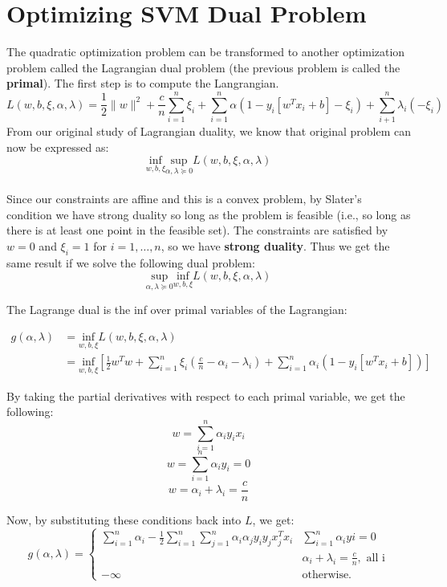 \documentclass[12pt]{article}
\begin{document}
\section{Optimizing SVM Dual Problem}
The quadratic optimization problem can be transformed to another optimization problem called the Lagrangian dual problem (the previous problem is called the \textbf{primal}). The first step is to compute the Langrangian.
$$L(w,b,\xi,\alpha,\lambda) = \frac{1}{2} \lVert w \rVert^{2} + \frac{c}{n} \sum_{i=1}^{n} \xi_{i} + \sum_{i=1}^{n} \alpha (1-y_{i}[w^{T}x_{i}+b]-\xi_{i}) + \sum_{i+1}^{n} \lambda_{i} (-\xi_{i})$$
From our original study of Lagrangian duality, we know that original problem can now be expressed as:
$$\underset{w,b,\xi}{\text{inf}} \underset{\alpha,\lambda \succcurlyeq 0}{\text{sup}} L(w,b,\xi,\alpha,\lambda)$$\\
Since our constraints are affine and this is a convex problem, by Slater's condition we have strong duality so long as the problem is feasible (i.e., so long as there is at least one point in the feasible set). The constraints are satisfied by $w=0$ and $\xi_{i} = 1$ for $i = 1,\dots,n$, so we have \textbf{strong duality}. Thus we get the same result if we solve the following dual problem:
$$\underset{\alpha,\lambda \succcurlyeq 0}{\text{sup}} \underset{w,b,\xi}{\text{inf}} L(w,b,\xi,\alpha,\lambda)$$

The Lagrange dual is the inf over primal variables of the Lagrangian:

\begin{equation}
\begin{split}
g(\alpha, \lambda) & = \underset{w,b,\xi}{\text{inf}} L(w,b,\xi,\alpha,\lambda) \\
 & = \underset{w,b,\xi}{\text{inf}} [\frac{1}{2}w^{T}w + \sum_{i=1}^{n} \xi_{i}(\frac{c}{n} - \alpha_{i} - \lambda_{i}) + \sum_{i=1}^{n} \alpha_{i} (1 - y_{i}[w^{T}x_{i} + b])]
\end{split}
\end{equation}

By taking the partial derivatives with respect to each primal variable, we get the following:
$$w = \sum_{i=1}^{n} \alpha_{i}y_{i}x_{i}$$
$$w = \sum_{i=1}^{n} \alpha_{i}y_{i} = 0$$
$$w = \alpha_{i} + \lambda_{i} = \frac{c}{n}$$

Now, by substituting these conditions back into $L$, we get:
$$g(\alpha, \lambda) = \begin{cases}
\sum_{i=1}^{n} \alpha_{i} - \frac{1}{2} \sum_{i=1}^{n} \sum_{j=1}^{n} \alpha_{i}\alpha_{j}y_{i}y_{j}x_{j}^{T}x_{i} &  \sum_{i=1}^{n} \alpha_{i}y{i} = 0 \\
& \alpha_{i} + \lambda_{i} = \frac{c}{n}, \text{  all i}\\
-\infty & \text{otherwise.}
\end{cases}
$$
\end{document}

